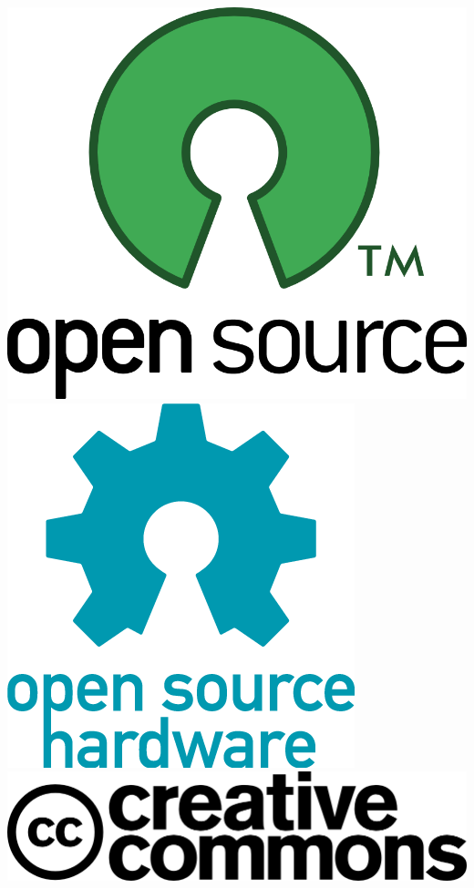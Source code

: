\documentclass{beamer}
\begin{document}
\begin{frame}
\begin{overlayarea}{\textwidth}{\textheight}
\begin{center}
{        \vspace{2em}
        \includegraphics[height=0.15\textheight]{../img/opensource}
        \hspace{2em}
        \includegraphics[height=0.15\textheight]{../img/opensourcehardware.png}
        \hspace{2em}
        \includegraphics[height=0.15\textheight]{../img/cc.png}}

\end{center}
\end{overlayarea}
\end{frame}
\end{document}
